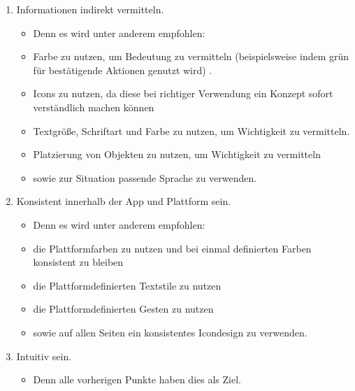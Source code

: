 \begin{enumerate}
	\item Informationen indirekt vermitteln.%
	\begin{itemize}%
		\item[] Denn es wird unter anderem empfohlen:%
		\item Farbe zu nutzen, um Bedeutung zu vermitteln (beispielsweise indem grün für bestätigende Aktionen genutzt wird) \cite{konventionen_foundations_color}.
		\item Icons zu nutzen, da diese bei richtiger Verwendung ein Konzept sofort verständlich machen können\cite{konventionen_foundations_icons} 
		\item Textgröße, Schriftart und Farbe zu nutzen, um Wichtigkeit zu vermitteln\cite{konventionen_foundations_typography}.
		\item Platzierung von Objekten zu nutzen, um Wichtigkeit zu vermitteln\cite{konventionen_layout}
		\item sowie zur Situation passende Sprache zu verwenden\cite{konventionen_foundations_writing}.
	\end{itemize}
	
	\item Konsistent innerhalb der App und Plattform sein.%
	\begin{itemize}%
		\item[] Denn es wird unter anderem empfohlen:%
		\item die Plattformfarben zu nutzen und bei einmal definierten Farben konsistent zu bleiben\cite{konventionen_foundations_color}
		\item die Plattformdefinierten Textstile zu nutzen\cite{konventionen_foundations_typography}
		\item die Plattformdefinierten Gesten zu nutzen\cite{konventionen_foundations_accessibility} 
		\item sowie auf allen Seiten ein konsistentes Icondesign zu verwenden\cite{konventionen_foundations_icons}.
	\end{itemize}
	
	
	\item Intuitiv sein.%
	\begin{itemize}
		\item Denn alle vorherigen Punkte haben dies als Ziel.
	\end{itemize}
	

\end{enumerate}
